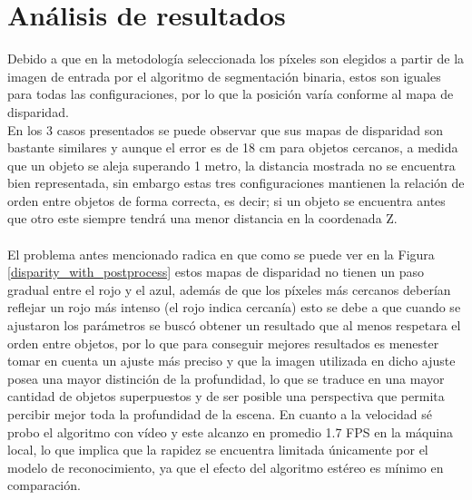 \section{Análisis de resultados}
Debido a que en la metodología seleccionada los píxeles son elegidos a partir de la imagen de entrada por el algoritmo de segmentación binaria, estos son iguales para todas las configuraciones, por lo que la posición varía conforme al mapa de disparidad. 
\\
En los 3 casos presentados se puede observar que sus mapas de disparidad son bastante similares y aunque el error es de 18 cm para objetos cercanos, a medida que un objeto se aleja superando 1 metro, la distancia mostrada no se encuentra bien representada, sin embargo estas tres configuraciones mantienen la relación de orden entre objetos de forma correcta, es decir; si un objeto se encuentra antes que otro este siempre tendrá una menor distancia en la coordenada Z.
\\
\\
El problema antes mencionado radica en que como se puede ver en la Figura \ref{disparity_with_postprocess} estos mapas de disparidad no tienen un paso gradual entre el rojo y el azul, además de que los píxeles más cercanos deberían reflejar un rojo más intenso (el rojo indica cercanía) esto se debe a que cuando se ajustaron los parámetros se buscó obtener un resultado que al menos respetara el orden entre objetos, por lo que para conseguir mejores resultados es menester tomar en cuenta un ajuste más preciso y que la imagen utilizada en dicho ajuste posea una mayor distinción de la profundidad, lo que se traduce en una mayor cantidad de objetos superpuestos y de ser posible una perspectiva que permita percibir mejor toda la profundidad de la escena. En cuanto a la velocidad sé probo el algoritmo con vídeo y este alcanzo en promedio 1.7 FPS en la máquina local, lo que implica que la rapidez se encuentra limitada únicamente por el modelo de reconocimiento, ya que el efecto del algoritmo estéreo es mínimo en comparación.